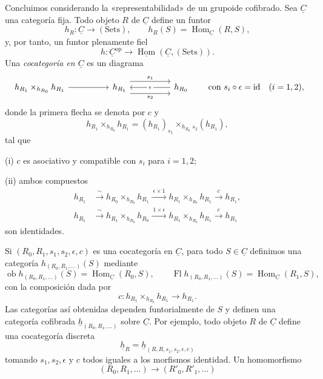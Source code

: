 \par
Concluimos considerando la «representabilidad» de un grupoide
cofibrado. Sea $\underline C$ una categoría fija. Todo objeto $R$ de
$\underline C$ define un funtor
\[
 h_R:\underline C\longrightarrow(\mathrm{Sets}),
 \qquad h_R(S)=\operatorname{Hom}_{\underline C}(R,S),
\]
y, por tanto, un funtor plenamente fiel
\[
 h:\underline C^{\mathrm{op}}
 \longrightarrow
 \underline{\operatorname{Hom}}(\underline C,(\mathrm{Sets})).
\]
Una \emph{cocategoría en $\underline C$} es un diagrama
\[
\begin{tikzcd}[column sep=huge]
 h_{R_1}\times_{h_{R_0}}h_{R_1} \arrow[r]
 & h_{R_1}
   \arrow[r,shift left=3,"{s_1}"]
   \arrow[r,shift right=3,"{s_2}"']
 & h_{R_0} \arrow[l,"{\epsilon}" description]
\end{tikzcd}
\qquad
\text{con }s_i\circ\epsilon=\operatorname{id}\quad(i=1,2),
\]
donde la primera flecha se denota por $c$ y
\[
 h_{R_1}\times_{h_{R_0}}h_{R_1}
 = (h_{R_1})_{s_1}\times_{h_{R_0}}{}_{s_2}(h_{R_1}),
\]
tal que

(i) $c$ es asociativo y compatible con $s_i$ para $i=1,2$;

(ii) ambos compuestos
\begin{align*}
 h_{R_1}&\xrightarrow{\ \sim\ }
 h_{R_0}\times_{h_{R_0}}h_{R_1}
 \xrightarrow{\ \epsilon\times1\ }
 h_{R_1}\times_{h_{R_0}}h_{R_1}
 \xrightarrow{\ c\ }h_{R_1},\\[1ex]
 h_{R_1}&\xrightarrow{\ \sim\ }
 h_{R_1}\times_{h_{R_0}}h_{R_0}
 \xrightarrow{\ 1\times\epsilon\ }
 h_{R_1}\times_{h_{R_0}}h_{R_1}
 \xrightarrow{\ c\ }h_{R_1}
\end{align*}
son identidades.

Si $(R_0,R_1,s_1,s_2,\epsilon,c)$ es una cocategoría en
$\underline C$, para todo $S\in\underline C$ definimos una categoría
$h_{(R_0,R_1,\ldots)}(S)$ mediante
\[
 \operatorname{ob}h_{(R_0,R_1,\ldots)}(S)
   =\operatorname{Hom}_{\underline C}(R_0,S),
 \qquad
 \operatorname{Fl}h_{(R_0,R_1,\ldots)}(S)
   =\operatorname{Hom}_{\underline C}(R_1,S),
\]
con la composición dada por
\[
 c:h_{R_1}\times_{h_{R_0}}h_{R_1}\longrightarrow h_{R_1}.
\]
Las categorías así obtenidas dependen funtorialmente de $S$ y definen
una categoría cofibrada $\underline h_{(R_0,R_1,\ldots)}$ sobre
$\underline C$. Por ejemplo, todo objeto $R$ de $\underline C$ define
una cocategoría discreta
\[
 \underline h_R
 =\underline h_{(R,R,s_1,s_2,\epsilon,c)}
\]
tomando $s_1,s_2,\epsilon$ y $c$ todos iguales a los morfismos
identidad. Un homomorfismo
\[
 (R_0,R_1,\ldots)\longrightarrow(R'_0,R'_1,\ldots)
\]

